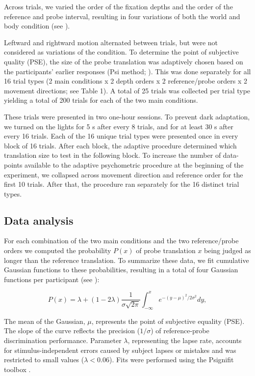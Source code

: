Across trials, we varied the order of the fixation depths and the order  of the reference and probe interval, resulting in four variations of both the world and body condition (see ).

Leftward and rightward motion alternated between trials, but were not considered as variations of the condition. To determine the point of subjective quality (PSE), the size of the probe translation was adaptively chosen based on the participants' earlier responses (Psi method; ). This was done separately for all 16 trial types (2 main conditions x 2 depth orders x 2 reference/probe orders x 2 movement directions; see Table 1). A total of 25 trials was collected per trial type yielding a total of 200 trials for each of the two main conditions.

These trials were presented in two one-hour sessions. To prevent dark adaptation, we turned on the lights for 5 \si{\second} after every 8 trials, and for at least 30 s after every 16 trials. Each of the 16 unique trial types were presented once in every block of 16 trials. After each block, the adaptive procedure determined which translation size to test in the following block. To increase the number of data-points available to the adaptive psychometric procedure at the beginning of the experiment, we collapsed across movement direction and reference order for the first 10 trials. After that, the procedure ran separately for the 16 distinct trial types.

\subsection{Data analysis}

For each combination of the two main conditions and the two reference/probe orders we computed the probability $P(x)$ of probe translation $x$ being  judged as longer than the reference translation. To summarize these data, we fit cumulative Gaussian functions to these probabilities, resulting in a total of four Gaussian functions per participant (see ):

\begin{equation}
\label{p4:eq1}
P(x) = \lambda + (1 - 2\lambda) \frac{1}{\sigma \sqrt{2\pi}} \int_{-\infty}^{x}{e^{-(y-\mu)^2 / 2\sigma^2}}dy,
\end{equation}

The mean of the Gaussian, $\mu$, represents the point of subjective equality (PSE). The slope of the curve reflects the precision ($1/\sigma$) of reference-probe discrimination performance. Parameter $\lambda$, representing the lapse rate, accounts for stimulus-independent errors caused by subject lapses or mistakes and was restricted to small values ($\lambda < 0.06$). Fits were performed using the Psignifit toolbox \cite{wichmann2001,wichmann2001b}.

